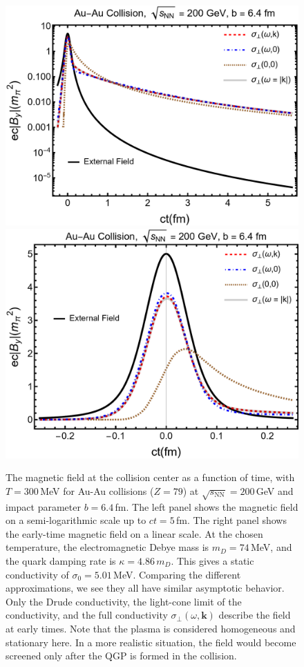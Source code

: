 \phantom{Phantom text}
\begin{figure}%
\centering              
\includegraphics[width=0.75\linewidth]{plots/chap02QCD/bf100.png}\\
\hspace{0.05\linewidth}
\includegraphics[width=0.75\linewidth]{plots/chap02QCD/bf100lin.png}
\caption{The magnetic field at the collision center as a function of time, with $T = 300$\,MeV for Au-Au collisions ($Z=79$) at $\sqrt{s_\text{NN}} = 200$\,GeV and impact parameter $b = 6.4\,$fm. The left panel shows the magnetic field on a semi-logarithmic scale up to $ct = 5$\,fm. The right panel shows the early-time magnetic field on a linear scale. At the chosen temperature, the electromagnetic Debye mass is $m_D = 74\,$MeV, and the quark damping rate is $\kappa = 4.86\,m_D$. This gives a static conductivity of $\sigma_0 = 5.01\,$MeV. Comparing the different approximations, we see they all have similar asymptotic behavior. Only the Drude conductivity, the light-cone limit of the conductivity, and the full conductivity $\sigma_\perp(\omega,\boldsymbol{k})$ describe the field at early times. Note that the plasma is considered homogeneous and stationary here. In a more realistic situation, the field would become screened only after the QGP is formed in the collision. \label{fig:bfcomp}}
\end{figure}

